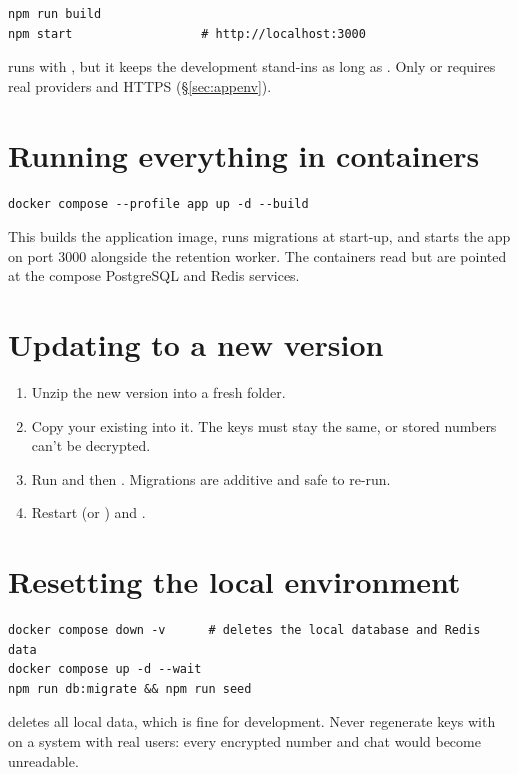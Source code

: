 \begin{lstlisting}
npm run build
npm start                  # http://localhost:3000
\end{lstlisting}

 runs with , but it keeps the development stand-ins as long as . Only  or  requires real providers and HTTPS (§\ref{sec:appenv}).

\section{Running everything in containers}

\begin{lstlisting}
docker compose --profile app up -d --build
\end{lstlisting}

This builds the application image, runs migrations at start-up, and starts the app on port 3000 alongside the retention worker. The containers read  but are pointed at the compose PostgreSQL and Redis services.

\section{Updating to a new version}

\begin{enumerate}
  \item Unzip the new version into a fresh folder.
  \item Copy your existing  into it. The keys must stay the same, or stored numbers can't be decrypted.
  \item Run  and then . Migrations are additive and safe to re-run.
  \item Restart  (or ) and .
\end{enumerate}

\section{Resetting the local environment}

\begin{lstlisting}
docker compose down -v      # deletes the local database and Redis data
docker compose up -d --wait
npm run db:migrate && npm run seed
\end{lstlisting}

\begin{warn}
 deletes all local data, which is fine for development. Never regenerate keys with  on a system with real users: every encrypted number and chat would become unreadable.
\end{warn}

